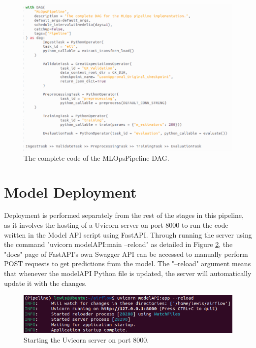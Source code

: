 \documentclass[12pt]{report}
\begin{document}
\begin{figure}[H]
    \centering
    \includegraphics[width=\linewidth]{Implementation/.Code/PipelineDAG.png}
    \caption{The complete code of the MLOpsPipeline DAG.}
    \label{fig:PipelineDAGCode}
\end{figure}

\section{Model Deployment}\label{sec:ImpDeployment}
Deployment is performed separately from the rest of the stages in this pipeline, 
as it involves the hosting of a Uvicorn server on port 8000 to run the code written 
in the Model API script using FastAPI. Through running the server using the command 
"uvicorn modelAPI:main --reload" as detailed in Figure 
\ref{fig:UviStartup}, the "docs" page of FastAPI's own Swagger API can be accessed to manually perform POST 
requests to get predictions from the model. The "--reload" argument means that whenever the 
modelAPI Python file is updated, the server will automatically update it with the changes.

\begin{figure}[H]
    \centering
    \includegraphics[width=\linewidth]{Implementation/FastAPI+Uvi/Startup.png}
    \caption{Starting the Uvicorn server on port 8000.}
    \label{fig:UviStartup}
\end{figure}
\end{document}
